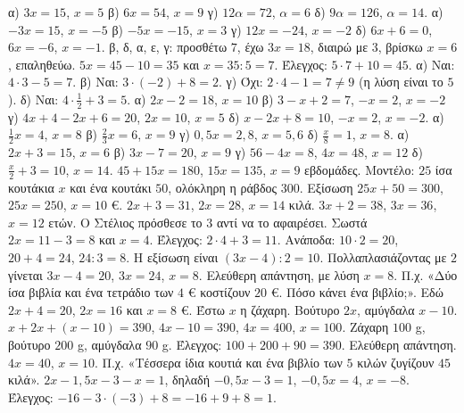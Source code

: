  α) $3x=15$, $x=5$ \quad β) $6x=54$, $x=9$ \quad γ) $12\alpha=72$, $\alpha=6$ \quad δ) $9\alpha=126$, $\alpha=14$.
 α) $-3x=15$, $x=-5$ \quad β) $-5x=-15$, $x=3$ \quad γ) $12x=-24$, $x=-2$ \quad δ) $6x+6=0$, $6x=-6$, $x=-1$.
 β, δ, α, ε, γ: προσθέτω $7$, έχω $3x=18$, διαιρώ με $3$, βρίσκω $x=6$, επαληθεύω.
 $5x=45-10=35$ και $x=35:5=7$. Έλεγχος: $5\cdot7+10=45$.
 α) Ναι: $4\cdot3-5=7$. \quad β) Ναι: $3\cdot(-2)+8=2$. \quad γ) Όχι: $2\cdot4-1=7\neq9$ (η λύση είναι το $5$). \quad δ) Ναι: $4\cdot\frac{1}{2}+3=5$.
 α) $2x-2=18$, $x=10$ \quad β) $3-x+2=7$, $-x=2$, $x=-2$ \quad γ) $4x+4-2x+6=20$, $2x=10$, $x=5$ \quad δ) $x-2x+8=10$, $-x=2$, $x=-2$.
 α) $\frac{1}{2}x=4$, $x=8$ \quad β) $\frac{2}{3}x=6$, $x=9$ \quad γ) $0{,}5x=2{,}8$, $x=5{,}6$ \quad δ) $\frac{x}{8}=1$, $x=8$.
 α) $2x+3=15$, $x=6$ \quad β) $3x-7=20$, $x=9$ \quad γ) $56-4x=8$, $4x=48$, $x=12$ \quad δ) $\frac{x}{2}+3=10$, $x=14$.
 $45+15x=180$, $15x=135$, $x=9$ εβδομάδες.
 Μοντέλο: $25$ ίσα κουτάκια $x$ και ένα κουτάκι $50$, ολόκληρη η ράβδος $300$. Εξίσωση $25x+50=300$, $25x=250$, $x=10$ €.
 $2x+3=31$, $2x=28$, $x=14$ κιλά.
 $3x+2=38$, $3x=36$, $x=12$ ετών.
 Ο Στέλιος πρόσθεσε το $3$ αντί να το αφαιρέσει. Σωστά $2x=11-3=8$ και $x=4$. Έλεγχος: $2\cdot4+3=11$.
 Ανάποδα: $10\cdot2=20$, $20+4=24$, $24:3=8$. Η εξίσωση είναι $(3x-4):2=10$. Πολλαπλασιάζοντας με $2$ γίνεται $3x-4=20$, $3x=24$, $x=8$.
 Ελεύθερη απάντηση, με λύση $x=8$. Π.χ. «Δύο ίσα βιβλία και ένα τετράδιο των $4$ € κοστίζουν $20$ €. Πόσο κάνει ένα βιβλίο;». Εδώ $2x+4=20$, $2x=16$ και $x=8$ €.
 Έστω $x$ η ζάχαρη. Βούτυρο $2x$, αμύγδαλα $x-10$. $x+2x+(x-10)=390$, $4x-10=390$, $4x=400$, $x=100$. Ζάχαρη $100$ g, βούτυρο $200$ g, αμύγδαλα $90$ g. Έλεγχος: $100+200+90=390$.
 Ελεύθερη απάντηση. $4x=40$, $x=10$. Π.χ. «Τέσσερα ίδια κουτιά και ένα βιβλίο των $5$ κιλών ζυγίζουν $45$ κιλά».
 $2x-1{,}5x-3-x=1$, δηλαδή $-0{,}5x-3=1$, $-0{,}5x=4$, $x=-8$. Έλεγχος: $-16-3\cdot(-3)+8=-16+9+8=1$.
